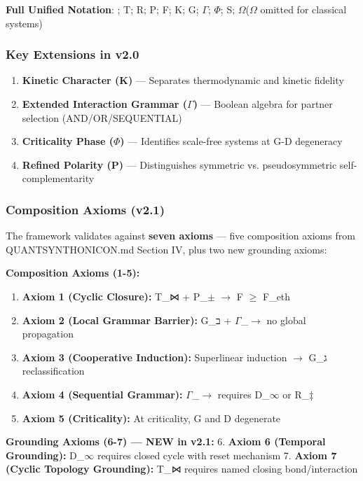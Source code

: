 \documentclass[12pt,a4paper]{article}
\begin{document}
\textbf{Full Unified Notation}: \langleD; T; R; P; F; K; G; $\Gamma$; $\Phi$; S; $\Omega$\rangle ($\Omega$ omitted for classical systems)

\subsubsection{Key Extensions in v2.0}

\begin{enumerate}
    \item \textbf{Kinetic Character (K)} --- Separates thermodynamic and kinetic fidelity
    \item \textbf{Extended Interaction Grammar ($\Gamma$)} --- Boolean algebra for partner selection (AND/OR/SEQUENTIAL)
    \item \textbf{Criticality Phase ($\Phi$)} --- Identifies scale-free systems at G-D degeneracy
    \item \textbf{Refined Polarity (P)} --- Distinguishes symmetric vs. pseudosymmetric self-complementarity
\end{enumerate}

\subsubsection{Composition Axioms (v2.1)}

The framework validates against \textbf{seven axioms} --- five composition axioms from QUANTSYNTHONICON.md Section IV, plus two new grounding axioms:

\textbf{Composition Axioms (1-5):}

\begin{enumerate}
    \item \textbf{Axiom 1 (Cyclic Closure):} T\_⋈ + P\_$\pm$ $\rightarrow$ F $\geq$ F\_eth
    \item \textbf{Axiom 2 (Local Grammar Barrier):} G\_ב + $\Gamma$\_\otimes $\rightarrow$ no global propagation
    \item \textbf{Axiom 3 (Cooperative Induction):} Superlinear induction $\rightarrow$ G\_ג reclassification
    \item \textbf{Axiom 4 (Sequential Grammar):} $\Gamma$\_$\rightarrow$ requires D\_$\infty$ or R\_‡
    \item \textbf{Axiom 5 (Criticality):} At criticality, G and D degenerate
\end{enumerate}

\textbf{Grounding Axioms (6-7) --- NEW in v2.1:}
6. \textbf{Axiom 6 (Temporal Grounding):} D\_$\infty$ requires closed cycle with reset mechanism
7. \textbf{Axiom 7 (Cyclic Topology Grounding):} T\_⋈ requires named closing bond/interaction
\end{document}
